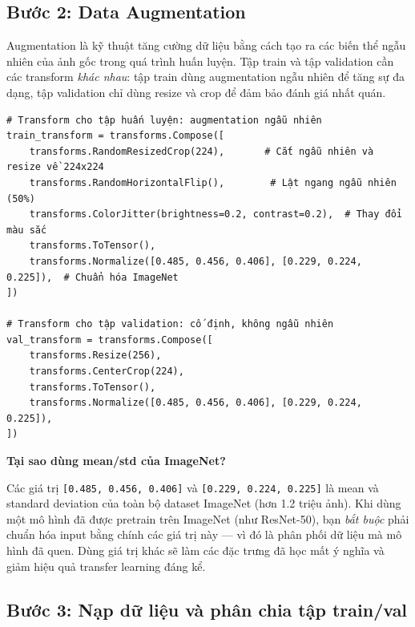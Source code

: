 \subsection{Bước 2: Data Augmentation}
\label{subsec:cls_augmentation}

Augmentation là kỹ thuật tăng cường dữ liệu bằng cách tạo ra các biến thể ngẫu nhiên của ảnh gốc trong quá trình huấn luyện. Tập train và tập validation cần các transform \textit{khác nhau}: tập train dùng augmentation ngẫu nhiên để tăng sự đa dạng, tập validation chỉ dùng resize và crop để đảm bảo đánh giá nhất quán.

\begin{verbatim}
# Transform cho tập huấn luyện: augmentation ngẫu nhiên
train_transform = transforms.Compose([
    transforms.RandomResizedCrop(224),       # Cắt ngẫu nhiên và resize về 224x224
    transforms.RandomHorizontalFlip(),        # Lật ngang ngẫu nhiên (50%)
    transforms.ColorJitter(brightness=0.2, contrast=0.2),  # Thay đổi màu sắc
    transforms.ToTensor(),
    transforms.Normalize([0.485, 0.456, 0.406], [0.229, 0.224, 0.225]),  # Chuẩn hóa ImageNet
])

# Transform cho tập validation: cố định, không ngẫu nhiên
val_transform = transforms.Compose([
    transforms.Resize(256),
    transforms.CenterCrop(224),
    transforms.ToTensor(),
    transforms.Normalize([0.485, 0.456, 0.406], [0.229, 0.224, 0.225]),
])
\end{verbatim}

\begin{mdframed}[style=infobox]
\textbf{Tại sao dùng mean/std của ImageNet?}

Các giá trị \texttt{[0.485, 0.456, 0.406]} và \texttt{[0.229, 0.224, 0.225]} là mean và standard deviation của toàn bộ dataset ImageNet (hơn 1.2 triệu ảnh). Khi dùng một mô hình đã được pretrain trên ImageNet (như ResNet-50), bạn \textit{bắt buộc} phải chuẩn hóa input bằng chính các giá trị này --- vì đó là phân phối dữ liệu mà mô hình đã quen. Dùng giá trị khác sẽ làm các đặc trưng đã học mất ý nghĩa và giảm hiệu quả transfer learning đáng kể.
\end{mdframed}

\subsection{Bước 3: Nạp dữ liệu và phân chia tập train/val}
\label{subsec:cls_dataloader}

